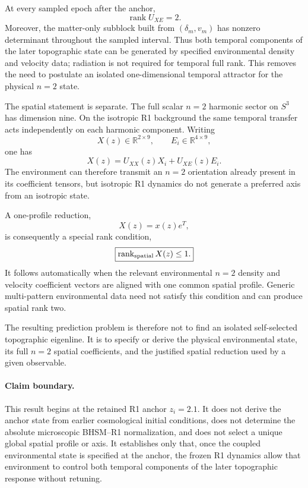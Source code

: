 At every sampled epoch after the anchor,
\begin{equation}
\boxed{\operatorname{rank}U_{XE}=2.}
\end{equation}
Moreover, the matter-only subblock built from $(\delta_m,v_m)$ has nonzero
determinant throughout the sampled interval.  Thus both temporal components of
the later topographic state can be generated by specified environmental
density and velocity data; radiation is not required for temporal full rank.
This removes the need to postulate an isolated one-dimensional temporal
attractor for the physical $n=2$ state.

The spatial statement is separate.  The full scalar $n=2$ harmonic sector on
$S^3$ has dimension nine.  On the isotropic R1 background the same temporal
transfer acts independently on each harmonic component.  Writing
\begin{equation}
X(z)\in\mathbb R^{2\times9},
\qquad
E_i\in\mathbb R^{4\times9},
\end{equation}
one has
\begin{equation}
\boxed{
X(z)=U_{XX}(z)X_i+U_{XE}(z)E_i .
}
\end{equation}
The environment can therefore transmit an $n=2$ orientation already present
in its coefficient tensors, but isotropic R1 dynamics do not generate a
preferred axis from an isotropic state.

A one-profile reduction,
\begin{equation}
X(z)=x(z)e^T ,
\end{equation}
is consequently a special rank condition,
\begin{equation}
\boxed{
\operatorname{rank}_{\rm spatial}X(z)\le1.
}
\end{equation}
It follows automatically when the relevant environmental $n=2$ density and
velocity coefficient vectors are aligned with one common spatial profile.
Generic multi-pattern environmental data need not satisfy this condition and
can produce spatial rank two.

The resulting prediction problem is therefore not to find an isolated
self-selected topographic eigenline.  It is to specify or derive the physical
environmental state, its full $n=2$ spatial coefficients, and the justified
spatial reduction used by a given observable.

\paragraph{Claim boundary.}
This result begins at the retained R1 anchor $z_i=2.1$.  It does not derive the
anchor state from earlier cosmological initial conditions, does not determine
the absolute microscopic BHSM--R1 normalization, and does not select a unique
global spatial profile or axis.  It establishes only that, once the coupled
environmental state is specified at the anchor, the frozen R1 dynamics allow
that environment to control both temporal components of the later
topographic response without retuning.
